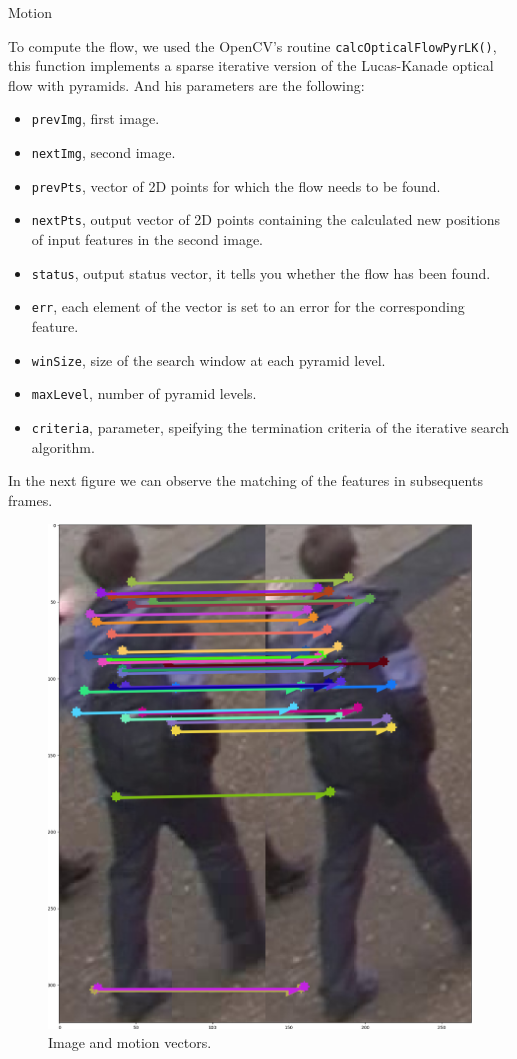 Motion


To compute the flow, we used the OpenCV's routine \texttt{calcOpticalFlowPyrLK()}, this function implements a sparse iterative version of the Lucas-Kanade optical flow with pyramids. And his parameters are the following:
 
\begin{itemize}

\item \texttt{prevImg}, first image.
\item \texttt{nextImg}, second image.
\item \texttt{prevPts}, vector of 2D points for which the flow needs to be found. 
\item \texttt{nextPts}, output vector of 2D points containing the calculated new positions of input features in the second image. 
\item \texttt{status}, output status vector, it tells you whether the flow has been found.  
\item \texttt{err}, each element of the vector is set to an error for the corresponding feature.
\item \texttt{winSize}, size of the search window at each pyramid level. 
\item \texttt{maxLevel}, number of pyramid levels.  
\item \texttt{criteria}, parameter, speifying the termination criteria of the iterative search algorithm.
\end{itemize}



In the next figure we can observe the matching of the features in subsequents frames.

\begin{figure}[hptb]
\centering         
\includegraphics[width=0.3\linewidth]{implementation/matching.png}
\caption{Image and motion vectors.} \label{motion1}
\end{figure}




